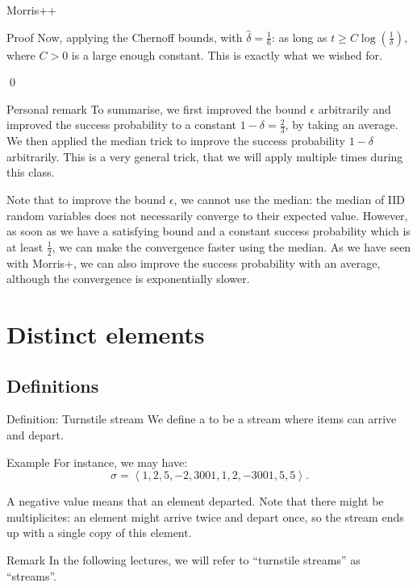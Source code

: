 \documentclass[a4paper]{article}
\begin{document}
\begin{parag}{Morris++}
\begin{subparag}{Proof}
        Now, applying the Chernoff bounds, with $\hat{\delta} = \frac{1}{6}$: 
        as long as $t \geq C \log\left(\frac{1}{\delta}\right)$, where $C > 0$ is a large enough constant. This is exactly what we wished for.
        
        \qed
    \end{subparag}

    \begin{subparag}{Personal remark}
        To summarise, we first improved the bound $\epsilon$ arbitrarily and improved the success probability to a constant $1 - \delta = \frac{2}{3}$, by taking an average. We then applied the median trick to improve the success probability $1 - \delta$ arbitrarily. This is a very general trick, that we will apply multiple times during this class.

        Note that to improve the bound $\epsilon$, we cannot use the median: the median of IID random variables does not necessarily converge to their expected value. However, as soon as we have a satisfying bound and a constant success probability which is at least $\frac{1}{2}$, we can make the convergence faster using the median. As we have seen with Morris+, we can also improve the success probability with an average, although the convergence is exponentially slower.
    \end{subparag}
\end{parag}

\section{Distinct elements}
\subsection{Definitions}

\begin{parag}{Definition: Turnstile stream}
    We define a  to be a stream where items can arrive and depart.

    \begin{subparag}{Example}
        For instance, we may have:
        \[\sigma = \left\langle 1, 2, 5, -2, 3001, 1, 2, -3001, 5, 5 \right\rangle.\]
        
        A negative value means that an element departed. Note that there might be multiplicites: an element might arrive twice and depart once, so the stream ends up with a single copy of this element.
    \end{subparag}

    \begin{subparag}{Remark}
        In the following lectures, we will refer to ``turnstile streams'' as ``streams''.
    \end{subparag}
\end{parag}
\end{document}
